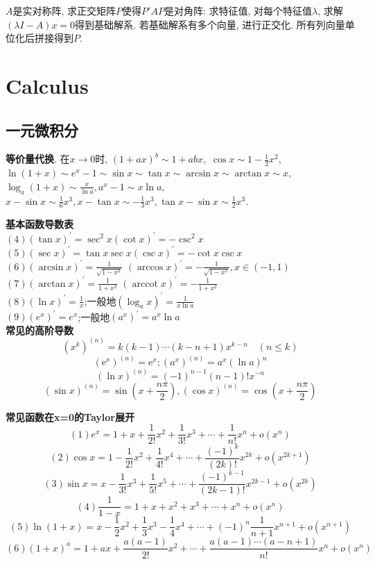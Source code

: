 \documentclass[UTF8]{ctexart}
\begin{document}
$A$是实对称阵, 求正交矩阵$P$使得$P'AP$是对角阵:
求特征值, 对每个特征值$\lambda$, 求解$(\lambda I-A)x=0$得到基础解系.
若基础解系有多个向量, 进行正交化.
所有列向量单位化后拼接得到$P$.

\section{Calculus}

\subsection{一元微积分}

\noindent \textbf{等价量代换}. 
在$x\to0$时, $(1+ax)^b\sim 1+abx,$
$\cos x\sim 1-\frac{1}{2}x^2,$
$\ln(1+x)\sim e^x-1\sim\sin x\sim\tan x
\sim\arcsin x\sim\arctan x\sim x,$
$\log_a(1+x)\sim \frac{x}{\ln a},a^x-1\sim x\ln a,$
$x-\sin x\sim \frac{1}{6}x^3,x-\tan x\sim -\frac{1}{3}x^3,
\tan x-\sin x\sim \frac{1}{2}x^3$.

\noindent \textbf{基本函数导数表}\\
$(4)  (\tan x)^{\prime}=\sec ^{2} x $\qquad $ (\cot x)^{\prime}=-\csc ^{2} x $\\
$(5)(\sec x)^{\prime}=\tan x \sec x $\qquad $ (\csc x)^{\prime}=-\cot x \csc x $\\
$(6)(\arcsin x)^{\prime}=\frac{1}{\sqrt{1-x^{2}}}$
\qquad $(\arccos x)^{\prime}=-\frac{1}{\sqrt{1-x^{2}}}, x \in(-1,1) $\\
$(7)(\arctan x)^{\prime}=\frac{1}{1+x^{2}} $
\qquad $(\operatorname{arccot} x)^{\prime}=-\frac{1}{1+x^{2}} $\\ 
$(8)(\ln x)^{\prime}=\frac{1}{x}$;一般地$\left(\log _{a} x\right)^{\prime}=\frac{1}{x \ln a}$\\
$(9)\left(e^{x}\right)^{\prime}=e^{x}$;一般地$\left(a^{x}\right)^{\prime}=a^{x} \ln a$\\


\noindent \textbf{常见的高阶导数}
$$\left(x^{k}\right)^{(n)}=k(k-1) \cdots(k-n+1) x^{k-n} \quad(n \leq k)$$
$$\left(\mathrm{e}^{x}\right)^{(n)}=\mathrm{e}^{x} ;\left(a^{x}\right)^{(n)}=a^{x}(\ln a)^{n}$$
$$(\ln x)^{(n)}=(-1)^{n-1}(n-1) ! x^{-n}$$
$$(\sin x)^{(n)}=\sin \left(x+\frac{n \pi}{2}\right),
(\cos x)^{(n)}=\cos \left(x+\frac{n \pi}{2}\right)$$


\noindent \textbf{常见函数在x=0的Taylor展开}
$$(1) e^x=1+x+\frac{1}{2!}x^{2}+\frac{1}{3!}x^{3}+\cdots+\frac{1}{n!}x^{n}+o(x^{n})$$
$$(2) \cos x=1-\frac{1}{2!}x^{2}+\frac{1}{4!}x^{4}+\cdots+\frac{(-1)^{k}}{(2k)!}x^{2k}+o(x^{2k+1})$$
$$(3) \sin x=x-\frac{1}{3!}x^{3}+\frac{1}{5!}x^{5}+\cdots+\frac{(-1)^{k-1}}{(2k-1)!}x^{2k-1}+o(x^{2k})$$
$$(4) \frac{1}{1-x}=1+x+x^{2}+x^{3}+\cdots+x^{n}+o(x^{n})$$
$$(5) \ln(1+x)=x-\frac{1}{2}x^{2}+\frac{1}{3}x^{3}-\frac{1}{4}x^{4}+
\cdots+(-1)^n\frac{1}{n+1}x^{n+1}+o(x^{n+1})$$
$$(6)(1+x)^{a}=1+a x+\frac{a(a-1)}{2!} x^2 +\cdots+
\frac{a(a-1) \cdots(a-n+1)}{n !} x^{n}+o(x^{n})$$
\end{document}
